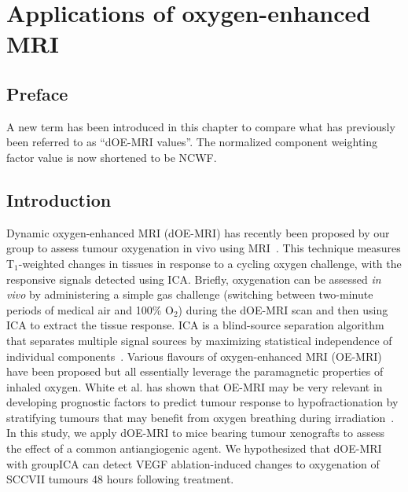 
\chapter{Applications of oxygen-enhanced MRI}
\label{ch:oemri3}

\section{Preface}

A new term has been introduced in this chapter to compare what has previously been referred to as ``dOE-MRI values''.
The normalized component weighting factor value is now shortened to be \acs{NCWF}.

\section{Introduction}

Dynamic oxygen-enhanced MRI (\ac{dOE-MRI}) has recently been proposed by our group to assess tumour oxygenation in vivo using MRI~\cite{Moosvi:2018ca}. 
This technique measures T$_1$-weighted changes in tissues in response to a cycling oxygen challenge, with the responsive signals detected using \ac{ICA}. 
Briefly, oxygenation can be assessed \emph{in vivo} by administering a simple gas challenge (switching between two-minute periods of medical air and 100\% O$_2$) during the \ac{dOE-MRI} scan and then using \ac{ICA} to extract the tissue response.
\ac{ICA} is a blind-source separation algorithm that separates multiple signal sources by maximizing statistical independence of individual components~\cite{Hyvarinen:2000vk}.
Various flavours of oxygen-enhanced MRI (OE-MRI) have been proposed but all essentially leverage the paramagnetic properties of inhaled oxygen.
White et al. has shown that OE-MRI may be very relevant in developing prognostic factors to predict tumour response to hypofractionation by stratifying tumours that may benefit from oxygen breathing during irradiation~\cite{White:2016fz}.
In this study, we apply \ac{dOE-MRI} to mice bearing tumour xenografts to assess the effect of a common antiangiogenic agent.
We hypothesized that \ac{dOE-MRI} with group\ac{ICA} can detect \acs{VEGF} ablation-induced changes to oxygenation of SCCVII tumours 48 hours following treatment.

